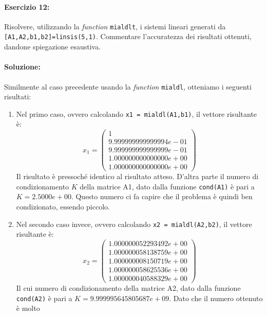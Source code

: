 \documentclass[12pt]{article}
\begin{document}
\paragraph{Esercizio 12:} Risolvere, utilizzando la \textit{function} \texttt{mialdlt}, i sistemi lineari generati da\\ \texttt{[A1,A2,b1,b2]=linsis(5,1)}. 
Commentare l’accuratezza dei risultati ottenuti, dandone spiegazione esaustiva.
\paragraph{Soluzione:}
Similmente al caso precedente usando la \textit{function} \texttt{mialdl}, otteniamo i seguenti risultati:
\begin{enumerate}
    \item Nel primo caso, ovvero calcolando \texttt{x1 = mialdl(A1,b1)}, il vettore risultante è: 
    \begin{equation*} x_1=
        \begin{pmatrix}
            1\\
            9.999999999999994e-01\\
            9.999999999999999e-01\\
            1.000000000000000e+00\\
            1.000000000000000e+00
        \end{pmatrix}
    \end{equation*}
    Il risultato è pressoché identico al risultato atteso. D'altra parte il numero di condizionamento \(K\) della matrice A1, dato dalla funzione \texttt{cond(A1)}
    è pari a \(K = 2.5000e+00\). Questo numero ci fa capire che il problema è quindi ben condizionato, essendo piccolo.
    \item Nel secondo caso invece, ovvero calcolando \texttt{x2 = mialdl(A2,b2)}, il vettore risultante è:
    \begin{equation*} x_2=
        \begin{pmatrix}
            1.000000052293492e+00\\
            1.000000058138759e+00\\
            1.000000008150719e+00\\
            1.000000058625536e+00\\
            1.000000040588329e+00
        \end{pmatrix}
    \end{equation*}
    Il cui numero di condizionamento della matrice A2, dato dalla funzione \texttt{cond(A2)} è pari a \(K = 9.999995645805687e+09\). Dato che il numero ottenuto è molto 

\end{enumerate}
\end{document}
